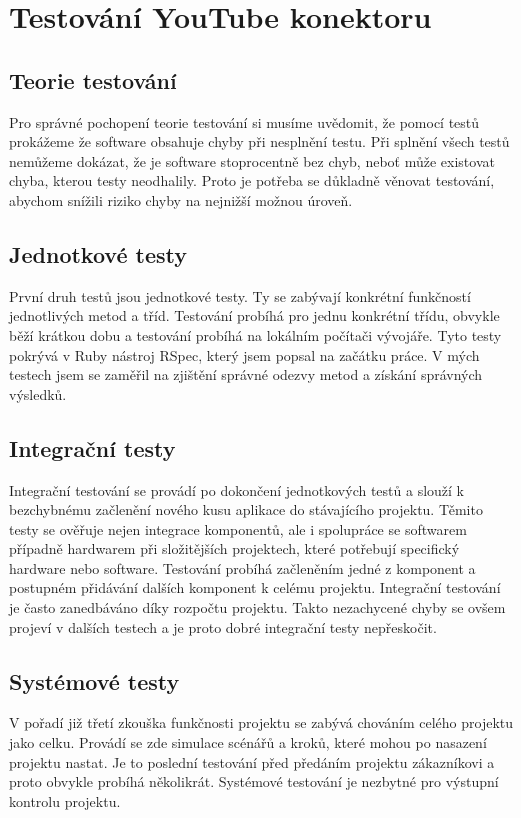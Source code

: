 \section{Testování YouTube konektoru}
\subsection{Teorie testování}
\par Pro správné pochopení teorie testování\cite{si1} si musíme uvědomit, že pomocí testů prokážeme že software obsahuje chyby při nesplnění testu. Při splnění všech testů nemůžeme dokázat, že je software stoprocentně bez chyb, neboť může existovat chyba, kterou testy neodhalily. Proto je potřeba se důkladně věnovat testování, abychom snížili riziko chyby na nejnižší možnou úroveň.
\subsection{Jednotkové testy}
\par První druh testů jsou jednotkové testy\cite{si1}. Ty se zabývají konkrétní funkčností jednotlivých metod a tříd. Testování probíhá pro jednu konkrétní třídu, obvykle běží krátkou dobu a testování probíhá na lokálním počítači vývojáře. Tyto testy pokrývá v Ruby nástroj RSpec, který jsem popsal na začátku práce. V mých testech jsem se zaměřil na zjištění správné odezvy metod a získání správných výsledků.
\subsection{Integrační testy}
\par Integrační testování\cite{si1} se provádí po dokončení jednotkových testů a slouží k bezchybnému začlenění nového kusu aplikace do stávajícího projektu. Těmito testy se ověřuje nejen integrace komponentů, ale i spolupráce se softwarem případně hardwarem při složitějších projektech, které potřebují specifický hardware nebo software. Testování probíhá začleněním jedné z komponent a postupném přidávání dalších komponent k celému projektu. Integrační testování je často zanedbáváno díky rozpočtu projektu. Takto nezachycené chyby se ovšem projeví v dalších testech a je proto dobré integrační testy nepřeskočit.
\subsection{Systémové testy}
\par V pořadí již třetí zkouška funkčnosti projektu se zabývá chováním celého projektu jako celku. Provádí se zde simulace scénářů a kroků, které mohou po nasazení projektu nastat. Je to poslední testování před předáním projektu zákazníkovi a proto obvykle probíhá několikrát. Systémové testování\cite{si1} je nezbytné pro výstupní kontrolu projektu.
